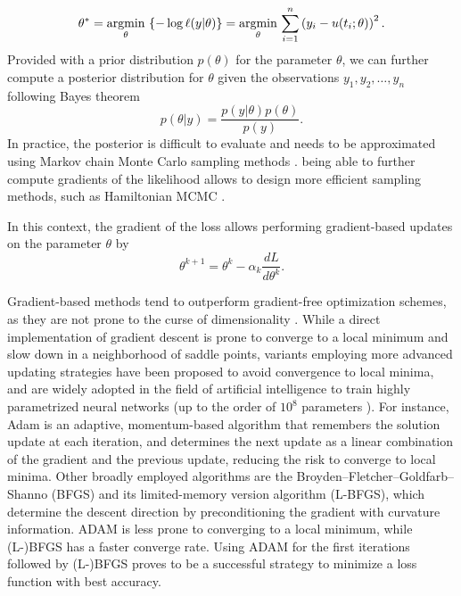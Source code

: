 \begin{itemize}
    \begin{equation}
        \theta^* 
        = 
        \underset{\theta}{\text{argmin}} \, \left \{ - \log \ell (y | \theta) \right \}
        = 
        \underset{\theta}{\text{argmin}} \, \sum_{i=1}^n \left( y_i - u(t_i; \theta) \right)^2 .
    \end{equation} 
    Provided with a prior distribution $p(\theta)$ for the parameter $\theta$, we can further compute a posterior distribution for $\theta$ given the observations $y_1, y_2, \ldots, y_n$ following Bayes theorem 
    \begin{equation}
        p(\theta | y) = \frac{p(y | \theta) p (\theta)}{p(y)}. 
    \end{equation}
    In practice, the posterior is difficult to evaluate and needs to be approximated using Markov chain Monte Carlo sampling methods \cite{gelman2013bayesian}. being able to further compute gradients of the likelihood allows to design more efficient sampling methods, such as Hamiltonian MCMC \cite{Betancourt_2017}. 
\end{itemize}

In this context, the gradient of the loss allows performing gradient-based updates on the parameter $\theta$ by 
\begin{equation}
    \theta^{k+1} 
    = 
    \theta^k 
    - 
    \alpha_k 
    \frac{dL}{d\theta^k}.
\end{equation}

Gradient-based methods tend to outperform gradient-free optimization schemes, as they are not prone to the curse of dimensionality \cite{Schartau2017}. While a direct implementation of gradient descent is prone to converge to a local minimum and slow down in a neighborhood of saddle points, variants employing more advanced updating strategies have been proposed \cite{ruder2016overview-gradient-descent} to avoid convergence to local minima, and are widely adopted in the field of artificial intelligence to train highly parametrized neural networks (up to the order of $10^8$ parameters \cite{NIPS2017_3f5ee243}). For instance, Adam \cite{Kingma2014} is an adaptive, momentum-based algorithm  that remembers the solution update at each iteration, and determines the next update as a linear combination of the gradient and the previous update, reducing the risk to converge to local minima. Other broadly employed algorithms are the Broyden–Fletcher–Goldfarb–Shanno (BFGS) and its limited-memory version algorithm (L-BFGS), which determine the descent direction by preconditioning the gradient with curvature information. ADAM is less prone to converging to a local minimum, while (L-)BFGS has a faster converge rate. Using ADAM for the first iterations followed by (L-)BFGS proves to be a successful strategy to minimize a loss function with best accuracy. 



